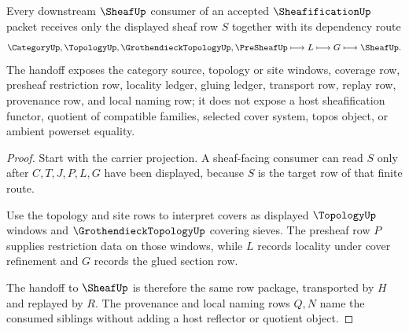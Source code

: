 \begin{theorem}
\label{thm:sheafification-sheaf-handoff}
Every downstream $\SheafUp$ consumer of an accepted $\SheafificationUp$ packet receives only the displayed sheaf row $S$ together with its dependency route
$$
\CategoryUp,\TopologyUp,\GrothendieckTopologyUp,\PreSheafUp
\longmapsto L \longmapsto G \longmapsto \SheafUp .
$$
The handoff exposes the category source, topology or site windows, coverage row, presheaf restriction row, locality ledger, gluing ledger, transport row, replay row, provenance row, and local naming row; it does not expose a host sheafification functor, quotient of compatible families, selected cover system, topos object, or ambient powerset equality.
\end{theorem}
\begin{proof}
Start with the carrier projection. A sheaf-facing consumer can read $S$ only after $C,T,J,P,L,G$ have been displayed, because $S$ is the target row of that finite route.

Use the topology and site rows to interpret covers as displayed $\TopologyUp$ windows and $\GrothendieckTopologyUp$ covering sieves. The presheaf row $P$ supplies restriction data on those windows, while $L$ records locality under cover refinement and $G$ records the glued section row.

The handoff to $\SheafUp$ is therefore the same row package, transported by $H$ and replayed by $R$. The provenance and local naming rows $Q,N$ name the consumed siblings without adding a host reflector or quotient object.
\end{proof}

